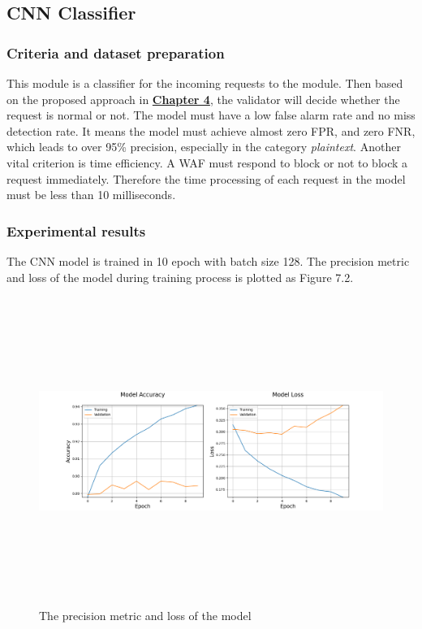 \subsection{CNN Classifier}
\subsubsection{Criteria and dataset preparation}
\hspace{0.5cm}This module is a classifier for the incoming requests to the module. Then based on the proposed approach in \hyperref[chap:proposed_approaches]{\textbf{Chapter 4}}, the validator will decide whether the request is normal or not. The model must have a low false alarm rate and no miss detection rate. It means the model must achieve almost zero FPR, and zero FNR, which leads to over 95\% precision, especially in the category \textit{plaintext}. Another vital criterion is time efficiency. A WAF must respond to block or not to block a request immediately. Therefore the time processing of each request in the model must be less than 10 milliseconds. 
\subsubsection{Experimental results}
\hspace{0.5cm}The CNN model is trained in 10 epoch with batch size 128. The precision metric and loss of the model during training process is plotted as Figure 7.2.
       
\begin{figure}[ht]
	\centering
	\includegraphics[width=\linewidth, height=10cm,keepaspectratio]{figures/metric and loss.png}
  \caption{The precision metric and loss of the model}  
\end{figure} 

